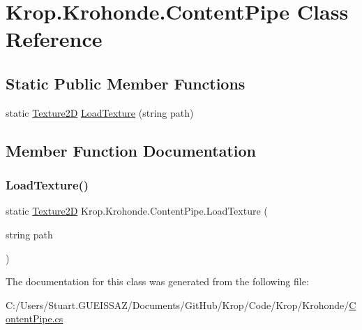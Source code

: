 \hypertarget{class_krop_1_1_krohonde_1_1_content_pipe}{}\section{Krop.\+Krohonde.\+Content\+Pipe Class Reference}
\label{class_krop_1_1_krohonde_1_1_content_pipe}
\subsection*{Static Public Member Functions}
\begin{DoxyCompactItemize}
\item 
static \mbox{\hyperlink{class_krop_1_1_krohonde_1_1_texture2_d}{Texture2D}} \mbox{\hyperlink{class_krop_1_1_krohonde_1_1_content_pipe_a4ff8f6d125632a87926b35e3bb8c8ada}{Load\+Texture}} (string path)
\end{DoxyCompactItemize}


\subsection{Member Function Documentation}
\mbox{\label{class_krop_1_1_krohonde_1_1_content_pipe_a4ff8f6d125632a87926b35e3bb8c8ada}} 
\subsubsection{\texorpdfstring{Load\+Texture()}{LoadTexture()}}
{\footnotesize\ttfamily static \mbox{\hyperlink{class_krop_1_1_krohonde_1_1_texture2_d}{Texture2D}} Krop.\+Krohonde.\+Content\+Pipe.\+Load\+Texture (\begin{DoxyParamCaption}\item[{string}]{path }\end{DoxyParamCaption})\hspace{0.3cm}{\ttfamily [static]}}



The documentation for this class was generated from the following file\+:\begin{DoxyCompactItemize}
\item 
C\+:/\+Users/\+Stuart.\+G\+U\+E\+I\+S\+S\+A\+Z/\+Documents/\+Git\+Hub/\+Krop/\+Code/\+Krop/\+Krohonde/\mbox{\hyperlink{_content_pipe_8cs}{Content\+Pipe.\+cs}}\end{DoxyCompactItemize}
